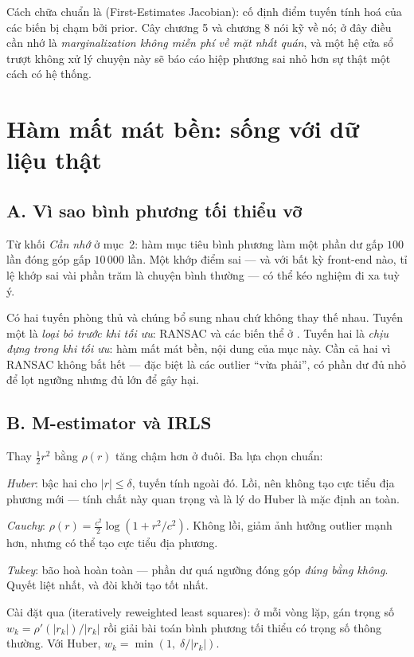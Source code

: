 \documentclass[../../vslam.tex]{subfiles}
\begin{document}
Cách chữa chuẩn là  (First-Estimates Jacobian): cố định điểm tuyến tính hoá của các biến bị chạm bởi prior. Cây  chương 5 và chương 8 nói kỹ về nó; ở đây điều cần nhớ là \emph{marginalization không miễn phí về mặt nhất quán}, và một hệ cửa sổ trượt không xử lý chuyện này sẽ báo cáo hiệp phương sai nhỏ hơn sự thật một cách có hệ thống.

\section{Hàm mất mát bền: sống với dữ liệu thật}

\subsection{A. Vì sao bình phương tối thiểu vỡ}

Từ khối \emph{Cần nhớ} ở mục~2: hàm mục tiêu bình phương làm một phần dư gấp \(100\) lần đóng góp gấp \(10\,000\) lần. Một khớp điểm sai --- và với bất kỳ front-end nào, tỉ lệ khớp sai vài phần trăm là chuyện bình thường --- có thể kéo nghiệm đi xa tuỳ ý.

Có hai tuyến phòng thủ và chúng bổ sung nhau chứ không thay thế nhau. Tuyến một là \emph{loại bỏ trước khi tối ưu}: RANSAC \cite{fischler1981ransac} và các biến thể ở . Tuyến hai là \emph{chịu đựng trong khi tối ưu}: hàm mất mát bền, nội dung của mục này. Cần cả hai vì RANSAC không bắt hết --- đặc biệt là các outlier ``vừa phải'', có phần dư đủ nhỏ để lọt ngưỡng nhưng đủ lớn để gây hại.

\subsection{B. M-estimator và IRLS}

Thay \(\frac12 r^2\) bằng \(\rho(r)\) tăng chậm hơn ở đuôi. Ba lựa chọn chuẩn:

\emph{Huber}: bậc hai cho \(|r| \le \delta\), tuyến tính ngoài đó. Lồi, nên không tạo cực tiểu địa phương mới --- tính chất này quan trọng và là lý do Huber là mặc định an toàn.

\emph{Cauchy}: \(\rho(r) = \frac{c^2}{2}\log(1 + r^2/c^2)\). Không lồi, giảm ảnh hưởng outlier mạnh hơn, nhưng có thể tạo cực tiểu địa phương.

\emph{Tukey}: bão hoà hoàn toàn --- phần dư quá ngưỡng đóng góp \emph{đúng bằng không}. Quyết liệt nhất, và đòi khởi tạo tốt nhất.

Cài đặt qua  (iteratively reweighted least squares): ở mỗi vòng lặp, gán trọng số \(w_k = \rho'(|r_k|)/|r_k|\) rồi giải bài toán bình phương tối thiểu có trọng số thông thường. Với Huber, \(w_k = \min(1,\; \delta/|r_k|)\).
\end{document}
